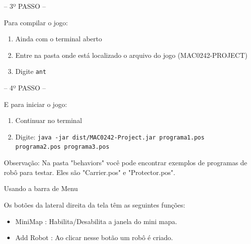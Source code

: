 \documentclass[a4paper]{article}
\begin{document}
{{{\begin{enumerate}
\end{enumerate}

\bigskip


\textcolor{NavyBlue}{-- 3º PASSO --}

Para compilar o jogo:

\begin{enumerate}
    \item Ainda com o terminal aberto

    \item Entre na pasta onde está localizado o arquivo do jogo (MAC0242-PROJECT)

    \item Digite \texttt{ant}
\end{enumerate}

\bigskip



\textcolor{NavyBlue}{-- 4º PASSO --}

E para iniciar o jogo: 

\begin{enumerate}                                            
    \item Continuar no terminal
 	\item Digite: \texttt{java -jar dist/MAC0242-Project.jar
          programa1.pos programa2.pos programa3.pos}
\end{enumerate}

Observação: Na pasta "behaviors" você pode encontrar exemplos de 
programas de robô para testar.
Eles são "Carrier.pos" e "Protector.pos".

\bigskip

\newpage %


{\textcolor{NavyBlue}{\LARGE Usando a barra de Menu}

\bigskip
\bigskip
\bigskip

Os botões da lateral direita da tela têm as seguintes
funções:

\bigskip

\begin{itemize}    
                                        
    \item \textcolor{NavyBlue}{MiniMap :}
        Habilita/Desabilita a janela do mini mapa.
    \bigskip
    
 	\item \textcolor{NavyBlue}{Add Robot :}
 	    Ao clicar nesse botão um robô é criado.
 	    

\end{itemize}}}}}
\end{document}
